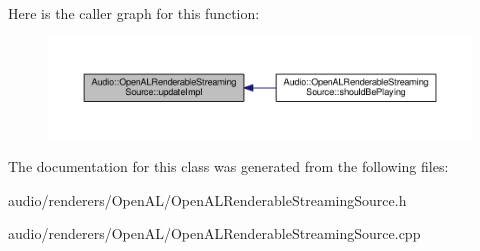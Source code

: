 Here is the caller graph for this function\+:
\nopagebreak
\begin{figure}[H]
\begin{center}
\leavevmode
\includegraphics[width=350pt]{d8/dcb/classAudio_1_1OpenALRenderableStreamingSource_ac484b12b9e263efb396efbb40ea8bf77_icgraph}
\end{center}
\end{figure}




The documentation for this class was generated from the following files\+:\begin{DoxyCompactItemize}
\item 
audio/renderers/\+Open\+A\+L/Open\+A\+L\+Renderable\+Streaming\+Source.\+h\item 
audio/renderers/\+Open\+A\+L/Open\+A\+L\+Renderable\+Streaming\+Source.\+cpp\end{DoxyCompactItemize}
